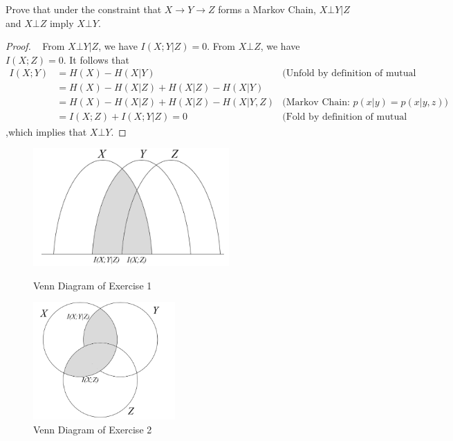 \begin{exercise}[]{Prove that under the constraint that $X\rightarrow Y \rightarrow Z$ forms a Markov Chain, $X\bot Y | Z$ and $X\bot Z$ imply $X\bot Y$}.
\begin{proof}
  \par{~}
  From $X\bot Y | Z$, we have $I(X;Y|Z)=0$. From $X\bot Z$, we have $I(X;Z)=0$. It follows that 
  \begin{equation}
    \begin{array}{rll}
      I(X;Y) &= H(X) - H(X|Y) &\text{(Unfold by definition of mutual information)}\\[2mm]
      &= H(X) - H(X|Z) + H(X|Z) - H(X|Y) & \\[2mm]
      &= H(X) - H(X|Z) + H(X|Z) - H(X|Y,Z) &\text{(Markov Chain: } p(x|y) = p(x|y,z) \text{)} \\[2mm]
      &= I(X;Z) + I(X;Y|Z) = 0 &\text{(Fold by definition of mutual information)} 
    \end{array}
  \end{equation}
  ,which implies that $X \bot Y$.
\end{proof}
\label{ex1}
\end{exercise}


\begin{figure}[htbp]
  \centering
      \begin{minipage}[t]{0.45\linewidth}
          \centering
          \includegraphics[height=4.5cm]{img/3-1.png}
          \caption{Venn Diagram of Exercise 1}
          \label{fig:ex1}
      \end{minipage}
      \begin{minipage}[t]{0.45\linewidth}
          \centering
          \includegraphics[height=4.5cm]{img/3-2.png}
          \caption{Venn Diagram of Exercise 2}
          \label{fig:ex2}
      \end{minipage}
\end{figure}


